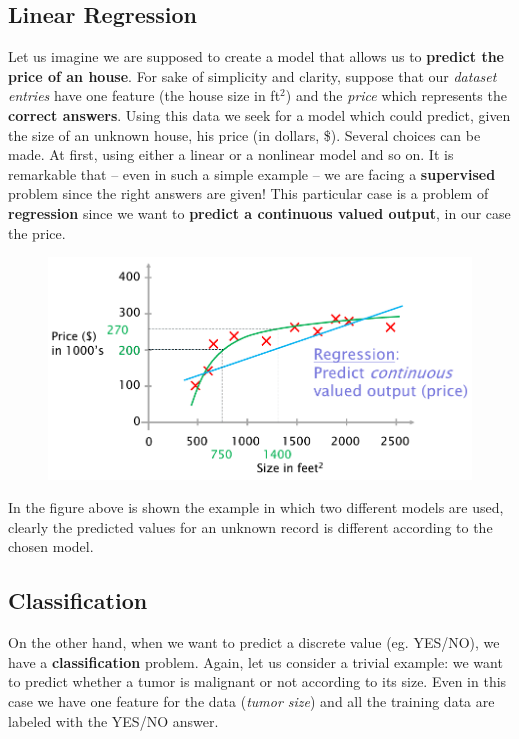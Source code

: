 \subsection{Linear Regression}
Let us imagine we are supposed to create a model that allows us to \textbf{predict the price of an house}. For sake of simplicity and clarity, suppose that our \textit{dataset entries} have one feature (the house size in ft$^2$) and the \textit{price} which represents the \textbf{correct answers}.
Using this data we seek for a model which could predict, given the size of an unknown house, his price (in dollars, \$). Several choices can be made. At first, using either a linear or a nonlinear model and so on. It is remarkable that -- even in such a simple example -- we are facing a \textbf{supervised} problem since the right answers are given! This particular case is a problem of \textbf{regression} since we want to \textbf{predict a continuous valued output}, in our case the price.

\begin{figure}[h]
    \centering
    \includegraphics[scale=0.5]{img/prices.png}
\end{figure}

In the figure above is shown the example in which two different models are used, clearly the predicted values for an unknown record is different according to the chosen model.

\subsection{Classification}
On the other hand, when we want to predict a discrete value (eg. YES/NO), we have a \textbf{classification} problem. Again, let us consider a trivial example: we want to predict whether a tumor is malignant or not according to its size. Even in this case we have one feature for the data (\textit{tumor size}) and all the training data are labeled with the YES/NO answer.

